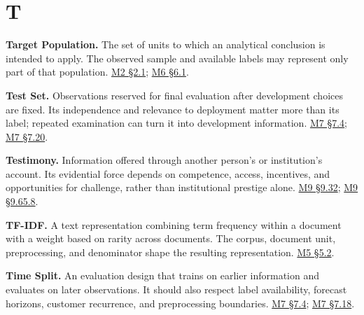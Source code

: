 \par{}
\hypertarget{module-t}{%
\section*{T}\label{module-t}}

\noindent\textbf{Target Population.} The set of units to which an analytical
conclusion is intended to apply. The observed sample and available
labels may represent only part of that population.
\href{Marketing_Analytics_Lecture_Notes.pdf\#M02-define-the-population-before-the-metric}{M2
§2.1};
\href{Marketing_Analytics_Lecture_Notes.pdf\#M06-define-the-treatment-outcome-and-estimand}{M6
§6.1}.

\noindent\textbf{Test Set.} Observations reserved for final evaluation after
development choices are fixed. Its independence and relevance to
deployment matter more than its label; repeated examination can turn it
into development information.
\href{Marketing_Analytics_Lecture_Notes.pdf\#M07-validation-cross-validation-and-leakage}{M7
§7.4};
\href{Marketing_Analytics_Lecture_Notes.pdf\#M07-repeated-selection-can-improve-a-score-without-improving-prediction}{M7
§7.20}.

\noindent\textbf{Testimony.} Information offered through another person's or
institution's account. Its evidential force depends on competence,
access, incentives, and opportunities for challenge, rather than
institutional prestige alone.
\hyperref[M09-who-counts-as-a-stakeholder-and-why]{M9
§9.32};
\hyperref[M09-maxims-of-data-production-and-disclosure]{M9
§9.65.8}.

\noindent\textbf{TF-IDF.} A text representation combining term frequency within a
document with a weight based on rarity across documents. The corpus,
document unit, preprocessing, and denominator shape the resulting
representation.
\href{Marketing_Analytics_Lecture_Notes.pdf\#M05-representing-language-with-counts-and-weights}{M5
§5.2}.

\noindent\textbf{Time Split.} An evaluation design that trains on earlier
information and evaluates on later observations. It should also respect
label availability, forecast horizons, customer recurrence, and
preprocessing boundaries.
\href{Marketing_Analytics_Lecture_Notes.pdf\#M07-validation-cross-validation-and-leakage}{M7
§7.4};
\href{Marketing_Analytics_Lecture_Notes.pdf\#M07-mcdonalds-forecasting-availability-with-missing-future-labels}{M7
§7.18}.

